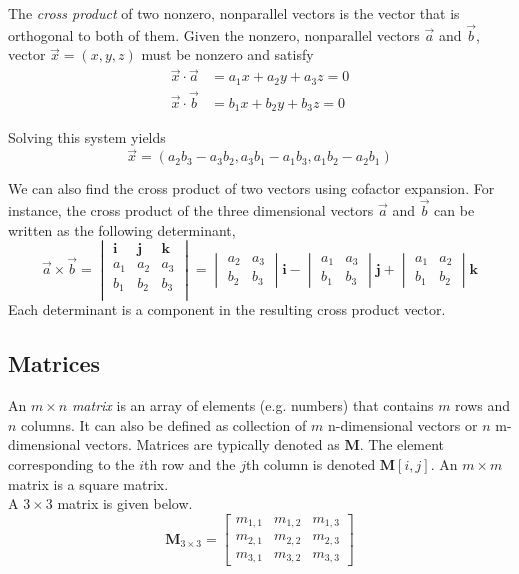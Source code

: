 \documentclass[12pt]{article}
\begin{document}
 The \emph{cross product} of two nonzero, nonparallel vectors is the vector that is orthogonal to both of them. Given the nonzero, nonparallel vectors $\vec{a}$ and $\vec{b}$, vector $\vec{x}=(x,y,z)$ must be nonzero and satisfy
\begin{align*}
\vec{x}\cdot\vec{a} &= a_1x+a_2y+a_3z = 0 \\
\vec{x}\cdot\vec{b} &= b_1x+b_2y+b_3z = 0
\end{align*}

 Solving this system yields
\[
\vec{x} = (a_2b_3-a_3b_2, a_3b_1-a_1b_3, a_1b_2-a_2b_1)
\]

 We can also find the cross product of two vectors using cofactor expansion. For instance, the cross product of the three dimensional vectors $\vec{a}$ and $\vec{b}$ can be written as the following determinant,
\[
\vec{a}\times\vec{b} = 
\begin{vmatrix}
\mathbf{i} & \mathbf{j} & \mathbf{k} \\
 a_1 & a_2 & a_3 \\
 b_1 & b_2 & b_3 \\
\end{vmatrix}
=
\begin{vmatrix}
a_2 & a_3 \\
b_2 & b_3
\end{vmatrix}
\mathbf{i}
-
\begin{vmatrix}
a_1 & a_3 \\
b_1 & b_3
\end{vmatrix}
\mathbf{j}
+
\begin{vmatrix}
a_1 & a_2 \\
b_1 & b_2
\end{vmatrix}
\mathbf{k}
\]
Each determinant is a component in the resulting cross product vector. \\

\subsection{Matrices}

An $m\times n$ \emph{matrix} is an array of elements (e.g. numbers) that contains $m$ rows and $n$ columns. It can also be defined as collection of $m$ n-dimensional vectors or $n$ m-dimensional vectors. Matrices are typically denoted as $\mathbf{M}$. The element corresponding to the $i$th row and the $j$th column is denoted $\mathbf{M}[i,j]$. An $m\times m$ matrix is a square matrix. \\

A $3\times3$ matrix is given below.
\[
\mathbf{M}_{3\times3}=
\begin{bmatrix}
  m_{1,1} & m_{1,2} & m_{1,3} \\
  m_{2,1} & m_{2,2} & m_{2,3} \\
  m_{3,1} & m_{3,2} & m_{3,3} 
 \end{bmatrix}
 \]
\end{document}

